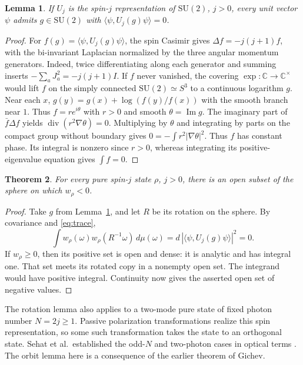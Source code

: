 \documentclass[10pt,a4paper]{article}
\newtheorem{theorem}{Theorem}
\newtheorem{lemma}[theorem]{Lemma}
\newcommand{\ip}[2]{\langle #1,#2\rangle}
\newcommand{\SU}{\mathrm{SU}}
\begin{document}
\begin{lemma}\label{lem:rotation}
If \(U_j\) is the spin-\(j\) representation of \(\SU(2)\), \(j>0\), every unit vector \(\psi\) admits \(g\in\SU(2)\) with \(\ip{\psi}{U_j(g)\psi}=0\).
\end{lemma}
\begin{proof}
For \(f(g)=\ip{\psi}{U_j(g)\psi}\), the spin Casimir gives
\(\Delta f=-j(j+1)f\), with the bi-invariant Laplacian normalized by the three angular momentum generators. Indeed, twice differentiating along each generator and summing inserts \(-\sum_a J_a^2=-j(j+1)I\). If \(f\) never vanished, the covering \(\exp:\mathbb C\to\mathbb C^\times\) would lift \(f\) on the simply connected \(\SU(2)\simeq S^3\) to a continuous logarithm \(g\). Near each \(x\), \(g(y)=g(x)+\log(f(y)/f(x))\) with the smooth branch near \(1\). Thus \(f=r e^{i\theta}\) with \(r>0\) and smooth \(\theta=\operatorname{Im}g\). The imaginary part of \(\bar f\Delta f\) yields
\(\operatorname{div}(r^2\nabla\theta)=0\).
Multiplying by \(\theta\) and integrating by parts on the compact group without boundary gives \(0=-\int r^2|\nabla\theta|^2\). Thus \(f\) has constant phase. Its integral is nonzero since \(r>0\), whereas integrating its positive-eigenvalue equation gives \(\int f=0\).
\end{proof}

\begin{theorem}\label{thm:negative}
For every pure spin-\(j\) state \(\rho\), \(j>0\), there is an open subset of the sphere on which \(w_\rho<0\).
\end{theorem}
\begin{proof}
Take \(g\) from Lemma~\ref{lem:rotation}, and let \(R\) be its rotation on the sphere. By covariance and \eqref{eq:trace},
\[
 \int w_\rho(\omega)w_\rho(R^{-1}\omega)\,d\mu(\omega)
 =d\,|\ip{\psi}{U_j(g)\psi}|^2=0.
\]
If \(w_\rho\ge0\), then its positive set is open and dense: it is analytic and has integral one. That set meets its rotated copy in a nonempty open set. The integrand would have positive integral. Continuity now gives the asserted open set of negative values.
\end{proof}

The rotation lemma also applies to a two-mode pure state of fixed photon number \(N=2j\ge1\). Passive polarization transformations realize this spin representation, so some such transformation takes the state to an orthogonal state. Sehat et al.\ established the odd-\(N\) and two-photon cases in optical terms \cite{sehat}. The orbit lemma here is a consequence of the earlier theorem of Gichev.
\end{document}

